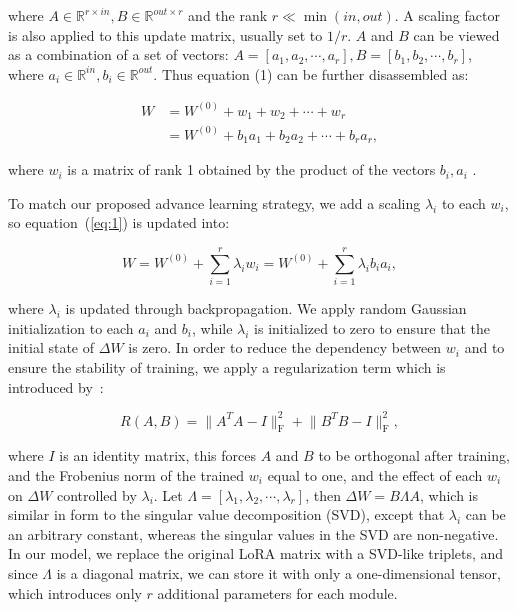 where $ A \in\mathbb{R}^{r\times in}, B \in\mathbb{R}^{out\times r} $ and the rank $r\ll \min \left( in, out \right)$. A scaling factor is also applied to this update matrix, usually set to $1/r$. $A$ and $B$ can be viewed as a combination of a set of vectors: $A=\left[ a_1,a_2,\cdots ,a_r \right], B=\left[ b_1,b_2,\cdots ,b_r \right]$, where $a_i \in \mathbb{R}^{in}, b_i \in \mathbb{R}^{out}$. Thus equation (1) can be further disassembled as:

\begin{equation}
\begin{split}
W &= W^{\left( 0 \right)}+w_1+w_2+\cdots+w_r \\
  &= W^{\left( 0 \right)}+b_1a_1+b_2a_2+\cdots+b_ra_r ,
\end{split}
\end{equation}

where $w_i$ is a matrix of rank 1 obtained by the product of the vectors $b_i, a_i$ . 

To match our proposed advance learning strategy, we add a scaling $\lambda_i$ to each $w_i$, so equation~(\ref{eq:1}) is updated into:

\begin{equation}
W = W^{\left( 0 \right)}+\sum_{i=1}^r{\lambda_i w_i} = W^{\left( 0 \right)}+\sum_{i=1}^r{\lambda_i b_i a_i} ,
\end{equation}

where $\lambda_i$ is updated through backpropagation. We apply random Gaussian initialization to each $a_i$ and $b_i$, while $\lambda_i$ is initialized to zero to ensure that the initial state of $\Delta W$ is zero. In order to reduce the dependency between $w_i$ and to ensure the stability of training, we apply a regularization term which is introduced by~\citet{peft:adalora}:

\begin{equation} 
R\left( A,B \right) =\lVert A^TA-I \rVert _{\text{F}}^{2}+\lVert B^TB-I \rVert _{\text{F}}^{2} ,
\end{equation}

  
where $I$ is an identity matrix, this forces $A$ and $B$ to be orthogonal after training, and the Frobenius norm of the trained $w_i$ equal to one, and the effect of each $w_i$ on $\Delta W$ controlled by $\lambda_i$. Let $\Lambda = \left[\lambda_1,\lambda_2,\cdots,\lambda_r \right]$, then $\Delta W = B\Lambda A$, which is similar in form to the singular value decomposition (SVD), except that $\lambda_i$ can be an arbitrary constant, whereas the singular values in the SVD are non-negative. In our model, we replace the original LoRA matrix with a SVD-like triplets, and since $\Lambda$ is a diagonal matrix, we can store it with only a one-dimensional tensor, which introduces only $r$ additional parameters for each module.


